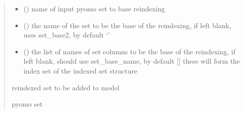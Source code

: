 \documentclass[letterpaper,10pt,english]{sphinxmanual}
\begin{document}
\begin{fulllineitems}
\begin{fulllineitems}
\begin{quote}
\begin{description}
\begin{itemize}
\item {} 
\sphinxAtStartPar
{} () \textendash{} name of input pyomo set to base reindexing

\item {} 
\sphinxAtStartPar
{} (\sphinxstyleliteralemphasis{\sphinxupquote{, }}) \textendash{} the name of the set to be the base of the reindexing, if left blank, uses set\_base2, by default ‘’

\item {} 
\sphinxAtStartPar
{} (\sphinxstyleliteralemphasis{\sphinxupquote{, }}) \textendash{} the list of names of set columns to be the base of the reindexing, if left blank, should
use set\_base\_name, by default {[}{]} these will form the index set of the indexed set structure

\end{itemize}

\sphinxAtStartPar
reindexed set to be added to model

\sphinxAtStartPar
pyomo set

\end{description}\end{quote}

\end{fulllineitems}



\end{fulllineitems}
\end{document}
